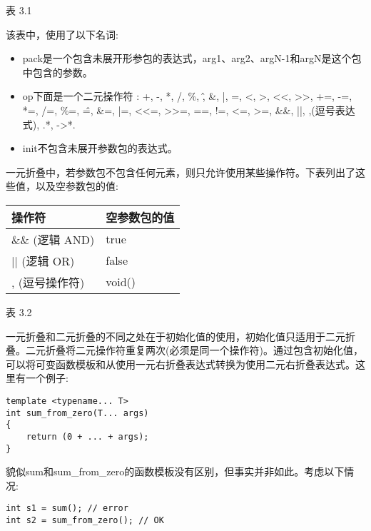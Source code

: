 \begin{center}
表 3.1
\end{center}

该表中，使用了以下名词:

\begin{itemize}
\item
pack是一个包含未展开形参包的表达式，arg1、arg2、argN-1和argN是这个包中包含的参数。

\item
op下面是一个二元操作符 : +, -, *, /, \%, \^, \&, |, =, <, >, <{}<, >{}>, +=, -=, *=, /=, \%=, \^=, \&=, |=, <{}<=, >{}>=, ==, !=, <=, >=, \&\&, ||, ,(逗号表达式), .*, ->*.

\item
init不包含未展开参数包的表达式。
\end{itemize}

一元折叠中，若参数包不包含任何元素，则只允许使用某些操作符。下表列出了这些值，以及空参数包的值:

\begin{table}[H]
\centering
	\begin{tabular}{|l|l|}
		\hline
		\textbf{操作符}  & \textbf{空参数包的值} \\ \hline
		\&\& (逻辑 AND) & true                             \\ \hline
		|| (逻辑 OR)    & false                            \\ \hline
		, (逗号操作符) & void()                           \\ \hline
	\end{tabular}
\end{table}

\begin{center}
表 3.2
\end{center}

一元折叠和二元折叠的不同之处在于初始化值的使用，初始化值只适用于二元折叠。二元折叠将二元操作符重复两次(必须是同一个操作符)。通过包含初始化值，可以将可变函数模板和从使用一元右折叠表达式转换为使用二元右折叠表达式。这里有一个例子:

\begin{lstlisting}[style=styleCXX]
template <typename... T>
int sum_from_zero(T... args)
{
	return (0 + ... + args);
}
\end{lstlisting}

貌似sum和sum\_from\_zero的函数模板没有区别，但事实并非如此。考虑以下情况:

\begin{lstlisting}[style=styleCXX]
int s1 = sum(); // error
int s2 = sum_from_zero(); // OK
\end{lstlisting}


